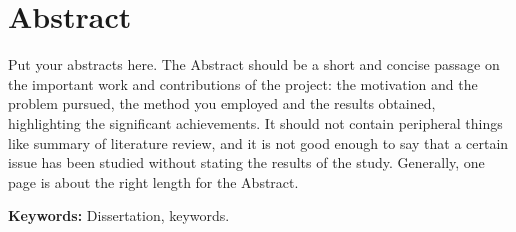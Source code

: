 \newpage


\chapter*{\centering Abstract}

\begin{spacing}{1.5}
\setlength{\parskip}{0.3in}
\thispagestyle{addin}


Put your abstracts here. The Abstract should be a short and concise passage on the important work and contributions of the project: the motivation and the problem pursued, the method you employed and the results obtained, highlighting the significant achievements. It should not contain peripheral things like summary of literature review, and it is not good enough to say that a certain issue has been studied without stating the results of the study. Generally, one page is about the right length for the Abstract.

\par
\thispagestyle{addin} %
\textbf{Keywords:} Dissertation, keywords.
\end{spacing}
\newpage
